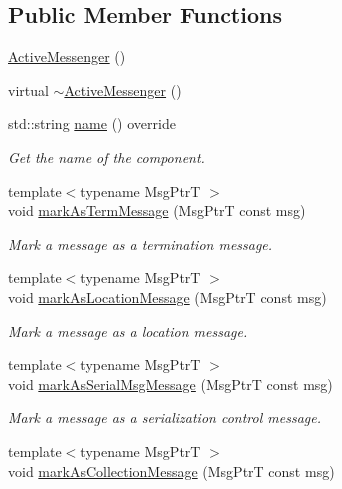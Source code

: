 \subsection*{Public Member Functions}
\begin{DoxyCompactItemize}
\item 
\hyperlink{structvt_1_1messaging_1_1_active_messenger_ab6b4f326bf77ec032d8ba86d51899c60}{Active\+Messenger} ()
\item 
virtual \hyperlink{structvt_1_1messaging_1_1_active_messenger_a10ef2a3dae9bcaddaa1f80903274e7b3}{$\sim$\+Active\+Messenger} ()
\item 
std\+::string \hyperlink{structvt_1_1messaging_1_1_active_messenger_a42112dea411907ca529bd5bc6586249a}{name} () override
\begin{DoxyCompactList}\small\item\em Get the name of the component. \end{DoxyCompactList}\item 
{\footnotesize template$<$typename Msg\+PtrT $>$ }\\void \hyperlink{structvt_1_1messaging_1_1_active_messenger_ad76f4f0ee9830f4431b57720163f715c}{mark\+As\+Term\+Message} (Msg\+PtrT const msg)
\begin{DoxyCompactList}\small\item\em Mark a message as a termination message. \end{DoxyCompactList}\item 
{\footnotesize template$<$typename Msg\+PtrT $>$ }\\void \hyperlink{structvt_1_1messaging_1_1_active_messenger_ae813b0555258b09de8fa324ed98dcd02}{mark\+As\+Location\+Message} (Msg\+PtrT const msg)
\begin{DoxyCompactList}\small\item\em Mark a message as a location message. \end{DoxyCompactList}\item 
{\footnotesize template$<$typename Msg\+PtrT $>$ }\\void \hyperlink{structvt_1_1messaging_1_1_active_messenger_ae4f8d48cda11b13d4447ab253ff18bf2}{mark\+As\+Serial\+Msg\+Message} (Msg\+PtrT const msg)
\begin{DoxyCompactList}\small\item\em Mark a message as a serialization control message. \end{DoxyCompactList}\item 
{\footnotesize template$<$typename Msg\+PtrT $>$ }\\void \hyperlink{structvt_1_1messaging_1_1_active_messenger_a0587ea992b0f1b06da38d52a3851aae5}{mark\+As\+Collection\+Message} (Msg\+PtrT const msg)

\end{DoxyCompactItemize}
